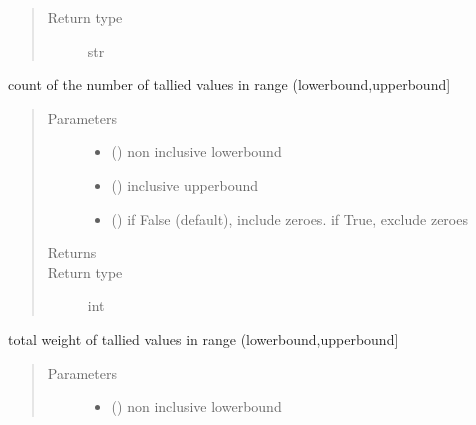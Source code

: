 \documentclass[letterpaper,10pt,english]{sphinxmanual}
\begin{document}
\begin{fulllineitems}
\begin{fulllineitems}
\begin{quote}
\begin{description}
\item[{Return type}] \leavevmode
str

\end{description}\end{quote}

\end{fulllineitems}


\begin{fulllineitems}
\label{\detokenize{Reference:salabim.Monitor.bin_number_of_entries}}
count of the number of tallied values in range (lowerbound,upperbound{]}
\begin{quote}\begin{description}
\item[{Parameters}] \leavevmode\begin{itemize}
\item {} 
 () \textendash{} non inclusive lowerbound

\item {} 
 () \textendash{} inclusive upperbound

\item {} 
 () \textendash{} if False (default), include zeroes. if True, exclude zeroes

\end{itemize}

\item[{Returns}] \leavevmode
{}

\item[{Return type}] \leavevmode
int

\end{description}\end{quote}

\end{fulllineitems}


\begin{fulllineitems}
\label{\detokenize{Reference:salabim.Monitor.bin_weight}}
total weight of tallied values in range (lowerbound,upperbound{]}
\begin{quote}\begin{description}
\item[{Parameters}] \leavevmode\begin{itemize}
\item {} 
 () \textendash{} non inclusive lowerbound


\end{itemize}
\end{description}
\end{quote}
\end{fulllineitems}
\end{fulllineitems}
\end{document}

